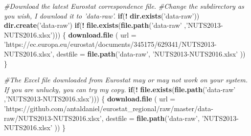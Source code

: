 \documentclass[]{article}
\newenvironment{Shaded}{\begin{snugshade}}{\end{snugshade}}
\newcommand{\CommentTok}[1]{\textcolor[rgb]{0.56,0.35,0.01}{\textit{#1}}}
\newcommand{\ControlFlowTok}[1]{\textcolor[rgb]{0.13,0.29,0.53}{\textbf{#1}}}
\newcommand{\DataTypeTok}[1]{\textcolor[rgb]{0.13,0.29,0.53}{#1}}
\newcommand{\KeywordTok}[1]{\textcolor[rgb]{0.13,0.29,0.53}{\textbf{#1}}}
\newcommand{\NormalTok}[1]{#1}
\newcommand{\OperatorTok}[1]{\textcolor[rgb]{0.81,0.36,0.00}{\textbf{#1}}}
\newcommand{\StringTok}[1]{\textcolor[rgb]{0.31,0.60,0.02}{#1}}
\begin{document}
\begin{Shaded}
\begin{Highlighting}[]
\CommentTok{#Download the latest Eurostat correspondence file.}
\CommentTok{#Change the subdirectory as you wish, I download it to 'data-raw'.}
\ControlFlowTok{if}\NormalTok{(}\OperatorTok{!}\StringTok{ }\KeywordTok{dir.exists}\NormalTok{(}\StringTok{'data-raw'}\NormalTok{)) }\KeywordTok{dir.create}\NormalTok{(}\StringTok{'data-raw'}\NormalTok{)}
\ControlFlowTok{if}\NormalTok{(}\OperatorTok{!}\StringTok{ }\KeywordTok{file.exists}\NormalTok{(}\KeywordTok{file.path}\NormalTok{(}\StringTok{'data-raw'}\NormalTok{ ,}\StringTok{'NUTS2013-NUTS2016.xlsx'}\NormalTok{))) \{}
  \KeywordTok{download.file}\NormalTok{ ( }\DataTypeTok{url =} \StringTok{'https://ec.europa.eu/eurostat/documents/345175/629341/NUTS2013-NUTS2016.xlsx'}\NormalTok{, }\DataTypeTok{destfile =} \KeywordTok{file.path}\NormalTok{(}\StringTok{'data-raw'}\NormalTok{, }\StringTok{'NUTS2013-NUTS2016.xlsx'}\NormalTok{ ))}
\NormalTok{\}}

\CommentTok{#The Excel file downloaded from Eurostat may or may not work on your system. If you are unlucky, you can try my copy. }
\ControlFlowTok{if}\NormalTok{(}\OperatorTok{!}\StringTok{ }\KeywordTok{file.exists}\NormalTok{(}\KeywordTok{file.path}\NormalTok{(}\StringTok{'data-raw'}\NormalTok{ ,}\StringTok{'NUTS2013-NUTS2016.xlsx'}\NormalTok{))) \{}
  \KeywordTok{download.file}\NormalTok{ ( }\DataTypeTok{url =} \StringTok{'https://github.com/antaldaniel/eurostat_regional/raw/master/data-raw/NUTS2013-NUTS2016.xlsx'}\NormalTok{, }\DataTypeTok{destfile =} \KeywordTok{file.path}\NormalTok{(}\StringTok{'data-raw'}\NormalTok{, }\StringTok{'NUTS2013-NUTS2016.xlsx'}\NormalTok{ ))}
\NormalTok{\}}


\end{Highlighting}
\end{Shaded}
\end{document}
